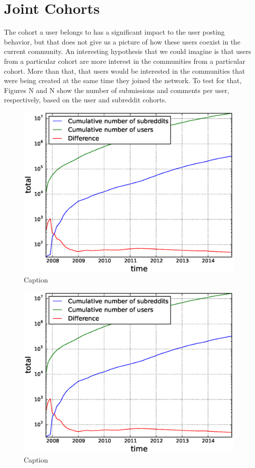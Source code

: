 \section{Joint Cohorts}

The cohort a user belongs to has a significant impact to the user posting behavior, but that does not give us a picture of how these users coexist in the current community. An interesting hypothesis that we could imagine is that users from a particular cohort are more interest in the communities from a particular cohort. More than that, that users would be interested in the communities that were being created at the same time they joined the network. To test for that, Figures N and N show the number of submissions and comments per user, respectively, based on the user and subreddit cohorts.

\begin{figure}[!tb]
\centering
\includegraphics[scale=0.4]{./images/cumulative_users_subreddits.eps}
\caption{Caption}
\label{fig:fig_label}
\end{figure}

\begin{figure}[!tb]
\centering
\includegraphics[scale=0.4]{./images/cumulative_users_subreddits.eps}
\caption{Caption}
\label{fig:fig_label}
\end{figure}

